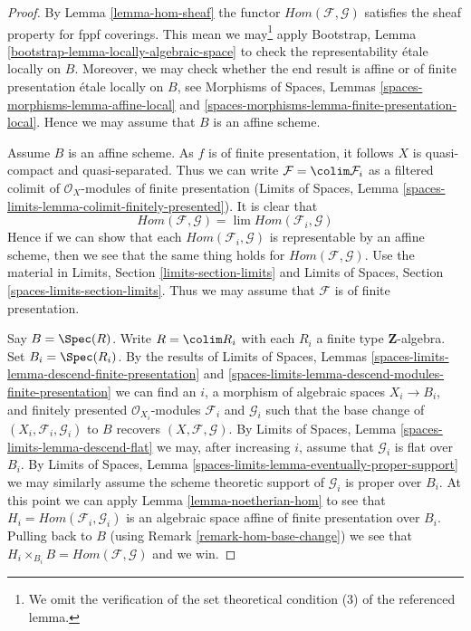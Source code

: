 \begin{proof}
By Lemma \ref{lemma-hom-sheaf} the functor
$\mathit{Hom}(\mathcal{F}, \mathcal{G})$ satisfies
the sheaf property for fppf coverings. This mean we may\footnote{We omit
the verification of the set theoretical condition (3) of the referenced
lemma.} apply
Bootstrap, Lemma \ref{bootstrap-lemma-locally-algebraic-space}
to check the representability \'etale locally on $B$. Moreover,
we may check whether the end result is affine or
of finite presentation \'etale locally on $B$, see
Morphisms of Spaces, Lemmas \ref{spaces-morphisms-lemma-affine-local} and
\ref{spaces-morphisms-lemma-finite-presentation-local}.
Hence we may assume that $B$ is an affine scheme.

\medskip\noindent
Assume $B$ is an affine scheme. As $f$ is of finite presentation, it follows
$X$ is quasi-compact and quasi-separated. Thus we can write
$\mathcal{F} = \colim \mathcal{F}_i$ as a filtered colimit of
$\mathcal{O}_X$-modules of finite presentation
(Limits of Spaces, Lemma \ref{spaces-limits-lemma-colimit-finitely-presented}).
It is clear that
$$
\mathit{Hom}(\mathcal{F}, \mathcal{G}) =
\lim \mathit{Hom}(\mathcal{F}_i, \mathcal{G})
$$
Hence if we can show that each $\mathit{Hom}(\mathcal{F}_i, \mathcal{G})$
is representable by an affine scheme, then we see that the same thing
holds for $\mathit{Hom}(\mathcal{F}, \mathcal{G})$. Use the material in
Limits, Section \ref{limits-section-limits} and
Limits of Spaces, Section \ref{spaces-limits-section-limits}.
Thus we may assume that $\mathcal{F}$ is of finite presentation.

\medskip\noindent
Say $B = \Spec(R)$. Write $R = \colim R_i$ with each $R_i$ a finite
type $\mathbf{Z}$-algebra. Set $B_i = \Spec(R_i)$. By the results of
Limits of Spaces, Lemmas
\ref{spaces-limits-lemma-descend-finite-presentation} and
\ref{spaces-limits-lemma-descend-modules-finite-presentation}
we can find an $i$, a morphism of algebraic spaces $X_i \to B_i$,
and finitely presented $\mathcal{O}_{X_i}$-modules $\mathcal{F}_i$ and
$\mathcal{G}_i$ such that the base change of
$(X_i, \mathcal{F}_i, \mathcal{G}_i)$ to $B$ recovers
$(X, \mathcal{F}, \mathcal{G})$. By
Limits of Spaces, Lemma \ref{spaces-limits-lemma-descend-flat}
we may, after increasing $i$, assume that $\mathcal{G}_i$
is flat over $B_i$. By
Limits of Spaces, Lemma \ref{spaces-limits-lemma-eventually-proper-support}
we may similarly assume the scheme theoretic support of $\mathcal{G}_i$
is proper over $B_i$. At this point we can apply
Lemma \ref{lemma-noetherian-hom}
to see that $H_i = \mathit{Hom}(\mathcal{F}_i, \mathcal{G}_i)$ is
an algebraic space affine of finite presentation over $B_i$.
Pulling back to $B$ (using Remark \ref{remark-hom-base-change})
we see that $H_i \times_{B_i} B = \mathit{Hom}(\mathcal{F}, \mathcal{G})$ 
and we win.
\end{proof}






